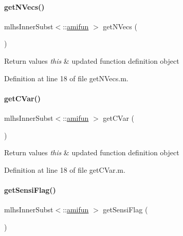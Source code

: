 \mbox{\label{classamifun_a3ae210044df5eb51e2f9280d03b86c3c}} 
\paragraph{\texorpdfstring{getNVecs()}{getNVecs()}}
{\footnotesize\ttfamily mlhs\+Inner\+Subst$<$\+::\mbox{\hyperlink{classamifun}{amifun}} $>$ get\+N\+Vecs (\begin{DoxyParamCaption}{ }\end{DoxyParamCaption})}


\begin{DoxyRetVals}{Return values}
{\em this} & updated function definition object \\
\hline
\end{DoxyRetVals}


Definition at line 18 of file get\+N\+Vecs.\+m.

\mbox{\label{classamifun_a969775839d9d32ff4a0ba70395117ca7}} 
\paragraph{\texorpdfstring{getCVar()}{getCVar()}}
{\footnotesize\ttfamily mlhs\+Inner\+Subst$<$\+::\mbox{\hyperlink{classamifun}{amifun}} $>$ get\+C\+Var (\begin{DoxyParamCaption}{ }\end{DoxyParamCaption})}


\begin{DoxyRetVals}{Return values}
{\em this} & updated function definition object \\
\hline
\end{DoxyRetVals}


Definition at line 18 of file get\+C\+Var.\+m.

\mbox{\label{classamifun_ac60147b051aa541057d0da18a78582a8}} 
\paragraph{\texorpdfstring{getSensiFlag()}{getSensiFlag()}}
{\footnotesize\ttfamily mlhs\+Inner\+Subst$<$\+::\mbox{\hyperlink{classamifun}{amifun}} $>$ get\+Sensi\+Flag (\begin{DoxyParamCaption}{ }\end{DoxyParamCaption})}


